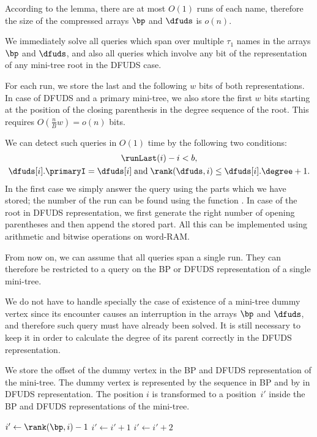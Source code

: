 According to the lemma, there are at most $O(1)$ runs of each name, therefore the size of the compressed arrays $\bp$ and $\dfuds$ is $o(n)$.

\bigbreak

We immediately solve all queries which span over multiple $\tau_1$ names in the arrays $\bp$ and $\dfuds$, and also all queries which involve any bit of the representation of any mini-tree root in the DFUDS case.

For each run, we store the last and the following $w$ bits of both representations.
In case of DFUDS and a primary mini-tree, we also store the first $w$ bits starting at the position of the closing parenthesis in the degree sequence of the root.
This requires $O\left(\frac{n}{B} w\right) = o(n)$ bits.

We can detect such queries in $O(1)$ time by the following two conditions:
\begin{gather*}
	\runLast(i) - i < b, \\
	\dfuds[i].\primaryI = \dfuds[i] \booland \rank(\dfuds, i) \le \dfuds[i].\degree + 1.
\end{gather*}
In the first case we simply answer the query using the parts which we have stored; the number of the run can be found using the function \elementIndex{}.
In case of the root in DFUDS representation, we first generate the right number of opening parentheses and then append the stored part.
All this can be implemented using arithmetic and bitwise operations on word-RAM.

From now on, we can assume that all queries span a single run.
They can therefore be restricted to a query on the BP or DFUDS representation of a single mini-tree.

We do not have to handle specially the case of existence of a mini-tree dummy vertex since its encounter causes an interruption in the arrays $\bp$ and $\dfuds$, and therefore such query must have already been solved.
It is still necessary to keep it in order to calculate the degree of its parent correctly in the DFUDS representation.

We store the offset of the dummy vertex in the BP and DFUDS representation of the mini-tree.
The dummy vertex is represented by the sequence \str{()} in BP and by \str{)} in DFUDS representation.
The position $i$ is transformed to a position~$i'$ inside the BP and DFUDS representations of the mini-tree.

\begin{algorithm}
\begin{algorithmic}
	\State $i' \gets \rank(\bp, i) - 1$
	 
		\State $i' \gets i' + 1$ 
	\EndIf
	 
		\State $i' \gets i' + 2$ 
	\EndIf
\EndFunction
\end{algorithmic}
\end{algorithm}

